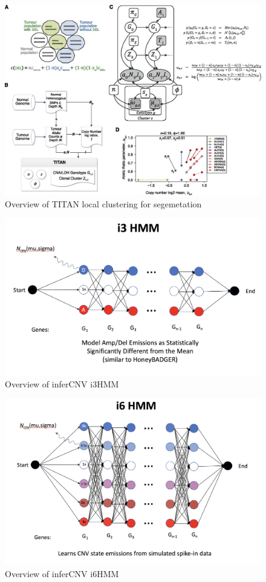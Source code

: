\documentclass[
]{book}
\begin{document}
\begin{figure}
\centering
\includegraphics{./figs/CNV/TITAN.jpg}
\caption{Overview of TITAN local clustering for segemetation}
\end{figure}

\begin{figure}
\centering
\includegraphics{./figs/CNV/infercnv_i3HMM_model.png}
\caption{Overview of inferCNV i3HMM}
\end{figure}

\begin{figure}
\centering
\includegraphics{./figs/CNV/infercnv_i6HMM_model.png}
\caption{Overview of inferCNV i6HMM}
\end{figure}
\end{document}
